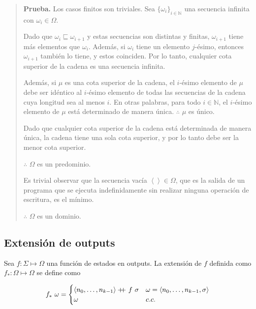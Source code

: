 \documentclass[article, 12pt]{article}
\newcommand\doubleplus{+\kern-1.3ex+\kern0.8ex}
\begin{document}
\small
\begin{quote}

\textbf{Prueba.} Los casos finitos son triviales. Sea $\{ \omega_i \}_{i \in \mathbb{N}}$ una secuencia infinita con $\omega_i \in \Omega$.

Dado que $\omega_i \sqsubseteq \omega_{i+1}$ y estas secuencias son distintas y finitas, $\omega_{i+1}$ tiene más elementos que $\omega_i$. Además, si $\omega_i$ tiene un elemento $j$-ésimo, entonces $\omega_{i+1}$ también lo tiene, y estos coinciden. Por lo tanto, cualquier cota superior de la cadena es una secuencia infinita.

Además, si $\mu$ es una cota superior de la cadena, el $i$-ésimo elemento de $\mu$ debe ser idéntico al $i$-ésimo elemento de todas las secuencias de la cadena cuya longitud sea al menos $i$. En otras palabras, para todo $i \in \mathbb{N}$, el $i$-ésimo elemento de $\mu$ está determinado de manera única. $\therefore$ $\mu$ es único.

Dado que cualquier cota superior de la cadena está determinada de manera única, la cadena tiene una sola cota superior, y por lo tanto debe ser la menor cota superior.

$\therefore$ $\Omega$ es un predominio.

Es trivial observar que la secuencia vacía $\left< \right> \in \Omega$, que es la salida de un programa que se ejecuta indefinidamente sin realizar ninguna operación de escritura, es el mínimo.

$\therefore$ $\Omega$ es un dominio.

\end{quote}
\normalsize

\pagebreak 
\subsection{Extensión de outputs}

Sea $f : \Sigma \mapsto \Omega$ una función de estados en outputs. La extensión
de $f$ definida como $f_* : \Omega \mapsto \Omega$ se define como

\begin{equation*}
  f_* ~ \omega = \begin{cases}
    \left<n_0, \ldots, n_{k-1} \right> \doubleplus f ~ \sigma & \omega =
    \left<n_0, \ldots, n_{k-1}, \sigma \right> \\ 
    \omega & c.c.
  \end{cases}
\end{equation*}
\end{document}
